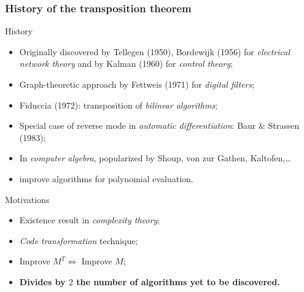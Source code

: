 \documentclass[10pt]{beamer}
\begin{document}
\begin{frame}
  \frametitle{History of the transposition theorem}

  \begin{block}{History}
    \begin{itemize}
    \item Originally discovered by \alert{Tellegen (1950)},
      \alert{Bordewijk (1956)} for \emph{electrical network theory}
      and by \alert{Kalman (1960)} for \emph{control theory};
    \item Graph-theoretic approach by \alert{Fettweis (1971)} for
      \emph{digital filters};
    \item \alert{Fiduccia (1972)}: transposition of \emph{bilinear
      algorithms};
    \item Special case of reverse mode in \emph{automatic differentiation}:
      \alert{Baur \& Strassen (1983)};
    \item In \emph{computer algebra}, popularized by \alert{Shoup},
      \alert{von zur Gathen}, \alert{Kaltofen},\dots
    \item \alert{\cite{BLS03}} improve algorithms for
      polynomial evaluation.
    \end{itemize}
  \end{block}
  
  \begin{block}{Motivations}
    \begin{itemize}
    \item Existence result in \emph{complexity theory};
    \item \emph{Code transformation} technique;
    \item Improve $M^T \Leftrightarrow$ Improve $M$;
    \item {\bf Divides by $2$ the number of algorithms yet to be discovered.}
    \end{itemize}
  \end{block}
\end{frame}

\end{document}
